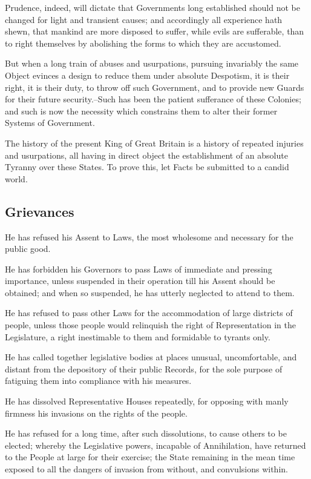 \documentclass[11pt,a4paper]{article}
\begin{document}
Prudence, indeed, will dictate that Governments long established should not be changed for light and transient causes; and accordingly all experience hath shewn, that mankind are more disposed to suffer, while evils are sufferable, than to right themselves by abolishing the forms to which they are accustomed.

But when a long train of abuses and usurpations, pursuing invariably the same Object evinces a design to reduce them under absolute Despotism, it is their right, it is their duty, to throw off such Government, and to provide new Guards for their future security.--Such has been the patient sufferance of these Colonies; and such is now the necessity which constrains them to alter their former Systems of Government.

The history of the present King of Great Britain is a history of repeated injuries and usurpations, all having in direct object the establishment of an absolute Tyranny over these States.
To prove this, let Facts be submitted to a candid world.

\subsection*{Grievances}

He has refused his Assent to Laws, the most wholesome and necessary for the public good.

He has forbidden his Governors to pass Laws of immediate and pressing importance, unless suspended in their operation till his Assent should be obtained; and when so suspended, he has utterly neglected to attend to them.

He has refused to pass other Laws for the accommodation of large districts of people, unless those people would relinquish the right of Representation in the Legislature, a right inestimable to them and formidable to tyrants only.

He has called together legislative bodies at places unusual, uncomfortable, and distant from the depository of their public Records, for the sole purpose of fatiguing them into compliance with his measures.

He has dissolved Representative Houses repeatedly, for opposing with manly firmness his invasions on the rights of the people.

He has refused for a long time, after such dissolutions, to cause others to be elected; whereby the Legislative powers, incapable of Annihilation, have returned to the People at large for their exercise; the State remaining in the mean time exposed to all the dangers of invasion from without, and convulsions within.
\end{document}
